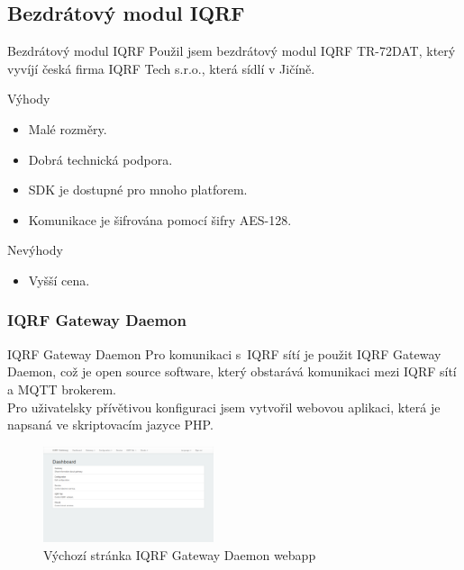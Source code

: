 \documentclass[11pt]{beamer}
\begin{document}
\subsection{Bezdrátový modul IQRF}

\begin{frame}{Bezdrátový modul IQRF}
  Použil jsem bezdrátový modul IQRF TR-72DAT, který vyvíjí česká firma IQRF Tech s.r.o., která sídlí v Jičíně.
  \begin{exampleblock}{Výhody}
    \begin{itemize}
      \item Malé rozměry.
      \item Dobrá technická podpora.
      \item SDK je dostupné pro mnoho platforem.
      \item Komunikace je šifrována pomocí šifry AES-128.
    \end{itemize}
  \end{exampleblock}
  \begin{alertblock}{Nevýhody}
    \begin{itemize}
      \item Vyšší cena.
    \end{itemize}
  \end{alertblock}
\end{frame}

\subsubsection{IQRF Gateway Daemon}

\begin{frame}{IQRF Gateway Daemon}
  Pro komunikaci s~IQRF sítí je použit IQRF Gateway Daemon, což je open source software, který obstarává komunikaci mezi IQRF sítí a MQTT brokerem. \\[4mm]
  Pro uživatelsky přívětivou konfiguraci jsem vytvořil webovou aplikaci, která je napsaná ve skriptovacím jazyce PHP.
  \begin{figure}
    \includegraphics[width = 50mm]{../img/iqrf/iqrf-daemon-webapp.png}
    \caption{Výchozí stránka IQRF Gateway Daemon webapp}
  \end{figure}
\end{frame}
\end{document}
